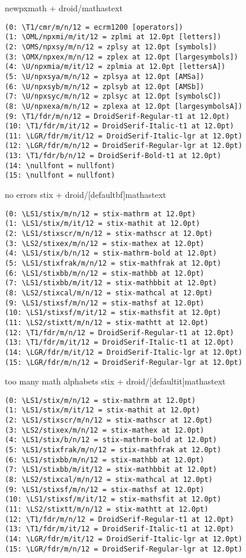 \documentclass[12pt]{article}
\begin{document}
newpxmath + droid/mathastext
\begin{lstlisting}
(0: \T1/cmr/m/n/12 = ecrm1200 [operators])
(1: \OML/npxmi/m/it/12 = zplmi at 12.0pt [letters])
(2: \OMS/npxsy/m/n/12 = zplsy at 12.0pt [symbols])
(3: \OMX/npxex/m/n/12 = zplex at 12.0pt [largesymbols])
(4: \U/npxmia/m/it/12 = zplmia at 12.0pt [lettersA])
(5: \U/npxsya/m/n/12 = zplsya at 12.0pt [AMSa])
(6: \U/npxsyb/m/n/12 = zplsyb at 12.0pt [AMSb])
(7: \U/npxsyc/m/n/12 = zplsyc at 12.0pt [symbolsC])
(8: \U/npxexa/m/n/12 = zplexa at 12.0pt [largesymbolsA])
(9: \T1/fdr/m/n/12 = DroidSerif-Regular-t1 at 12.0pt)
(10: \T1/fdr/m/it/12 = DroidSerif-Italic-t1 at 12.0pt)
(11: \LGR/fdr/m/it/12 = DroidSerif-Italic-lgr at 12.0pt)
(12: \LGR/fdr/m/n/12 = DroidSerif-Regular-lgr at 12.0pt)
(13: \T1/fdr/b/n/12 = DroidSerif-Bold-t1 at 12.0pt)
(14: \nullfont = nullfont)
(15: \nullfont = nullfont)  
\end{lstlisting}

no errors
stix + droid/[defaultbf]mathastext
\begin{lstlisting}
(0: \LS1/stix/m/n/12 = stix-mathrm at 12.0pt)
(1: \LS1/stix/m/it/12 = stix-mathit at 12.0pt)
(2: \LS1/stixscr/m/n/12 = stix-mathscr at 12.0pt)
(3: \LS2/stixex/m/n/12 = stix-mathex at 12.0pt)
(4: \LS1/stix/b/n/12 = stix-mathrm-bold at 12.0pt)
(5: \LS1/stixfrak/m/n/12 = stix-mathfrak at 12.0pt)
(6: \LS1/stixbb/m/n/12 = stix-mathbb at 12.0pt)
(7: \LS1/stixbb/m/it/12 = stix-mathbbit at 12.0pt)
(8: \LS2/stixcal/m/n/12 = stix-mathcal at 12.0pt)
(9: \LS1/stixsf/m/n/12 = stix-mathsf at 12.0pt)
(10: \LS1/stixsf/m/it/12 = stix-mathsfit at 12.0pt)
(11: \LS2/stixtt/m/n/12 = stix-mathtt at 12.0pt)
(12: \T1/fdr/m/n/12 = DroidSerif-Regular-t1 at 12.0pt)
(13: \T1/fdr/m/it/12 = DroidSerif-Italic-t1 at 12.0pt)
(14: \LGR/fdr/m/it/12 = DroidSerif-Italic-lgr at 12.0pt)
(15: \LGR/fdr/m/n/12 = DroidSerif-Regular-lgr at 12.0pt)  
\end{lstlisting}

too many math alphabets
stix + droid/[defaultit]mathastext
\begin{lstlisting}
(0: \LS1/stix/m/n/12 = stix-mathrm at 12.0pt)
(1: \LS1/stix/m/it/12 = stix-mathit at 12.0pt)
(2: \LS1/stixscr/m/n/12 = stix-mathscr at 12.0pt)
(3: \LS2/stixex/m/n/12 = stix-mathex at 12.0pt)
(4: \LS1/stix/b/n/12 = stix-mathrm-bold at 12.0pt)
(5: \LS1/stixfrak/m/n/12 = stix-mathfrak at 12.0pt)
(6: \LS1/stixbb/m/n/12 = stix-mathbb at 12.0pt)
(7: \LS1/stixbb/m/it/12 = stix-mathbbit at 12.0pt)
(8: \LS2/stixcal/m/n/12 = stix-mathcal at 12.0pt)
(9: \LS1/stixsf/m/n/12 = stix-mathsf at 12.0pt)
(10: \LS1/stixsf/m/it/12 = stix-mathsfit at 12.0pt)
(11: \LS2/stixtt/m/n/12 = stix-mathtt at 12.0pt)
(12: \T1/fdr/m/n/12 = DroidSerif-Regular-t1 at 12.0pt)
(13: \T1/fdr/m/it/12 = DroidSerif-Italic-t1 at 12.0pt)
(14: \LGR/fdr/m/it/12 = DroidSerif-Italic-lgr at 12.0pt)
(15: \LGR/fdr/m/n/12 = DroidSerif-Regular-lgr at 12.0pt)
\end{lstlisting}
\end{document}
